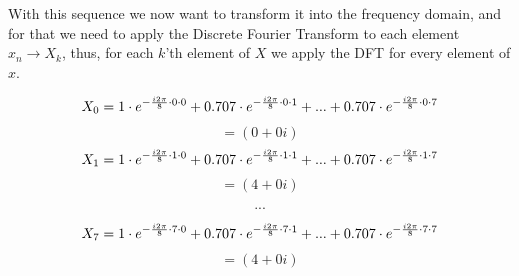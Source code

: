 \documentclass[
  oneside,
  11pt, a4paper,
  footinclude=true,
  headinclude=true,
  cleardoublepage=empty
]{scrbook}
\begin{document}
With this sequence we now want to transform it into the frequency domain, and for that we need to apply the Discrete Fourier Transform to each element \( x_{n} \rightarrow X_{k} \), thus, for each \(k\)'th element of \(X\) we apply the DFT for every element of \(x\).

\begin{equation*}
    X_{0} = 1 \cdot e^{- \frac{i 2 \pi}{8} \cdot 0 \cdot 0} \\
        + 0.707 \cdot e^{- \frac{i 2 \pi}{8} \cdot 0 \cdot 1}  \\
        + ...  \\
        + 0.707 \cdot e^{- \frac{i 2 \pi}{8} \cdot 0 \cdot 7} \\
\end{equation*}
\begin{equation*}
    = (0 + 0i)
\end{equation*}
\begin{equation*}
    X_{1} = 1 \cdot e^{- \frac{i 2 \pi}{8} \cdot 1 \cdot 0} \\
        + 0.707 \cdot e^{- \frac{i 2 \pi}{8} \cdot 1 \cdot 1}  \\
        + ...  \\
        + 0.707 \cdot e^{- \frac{i 2 \pi}{8} \cdot 1 \cdot 7} \\
\end{equation*}
\begin{equation*}
    = (4 + 0i)
\end{equation*}

\begin{equation*}
    . . .
\end{equation*}

\begin{equation*}
    X_{7} = 1 \cdot e^{- \frac{i 2 \pi}{8} \cdot 7 \cdot 0} \\
        + 0.707 \cdot e^{- \frac{i 2 \pi}{8} \cdot 7 \cdot 1}  \\
        + ...  \\
        + 0.707 \cdot e^{- \frac{i 2 \pi}{8} \cdot 7 \cdot 7} \\
\end{equation*}
\begin{equation*}
    = (4 + 0i)
\end{equation*}

\end{document}
